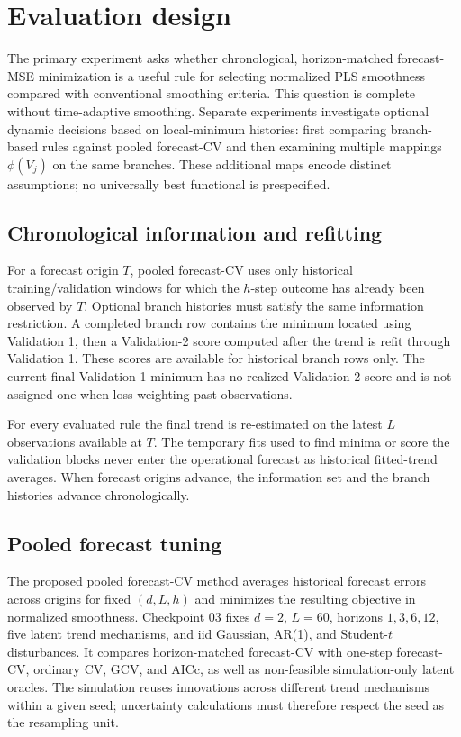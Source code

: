 \section{Evaluation design}
\label{sec:evaluation}

The primary experiment asks whether chronological, horizon-matched
forecast-MSE minimization is a useful rule for selecting normalized PLS
smoothness compared with conventional smoothing criteria. This question
is complete without time-adaptive smoothing. Separate experiments
investigate optional dynamic decisions based on local-minimum histories:
first comparing branch-based rules against pooled forecast-CV and then
examining multiple mappings $\phi(V_j)$ on the same branches. These
additional maps encode distinct assumptions; no universally best
functional is prespecified.

\subsection{Chronological information and refitting}

For a forecast origin $T$, pooled forecast-CV uses only historical
training/validation windows for which the $h$-step outcome has already
been observed by $T$. Optional branch histories must satisfy the same
information restriction.
A completed branch row contains the minimum located using Validation 1,
then a Validation-2 score computed after the trend is refit through
Validation 1. These scores are available for historical branch rows only.
The current final-Validation-1 minimum has no realized Validation-2 score
and is not assigned one when loss-weighting past observations.

For every evaluated rule the final trend is re-estimated on the latest
$L$ observations available at $T$. The temporary fits used to find minima
or score the validation blocks never enter the operational forecast as
historical fitted-trend averages. When forecast origins advance, the
information set and the branch histories advance chronologically.

\subsection{Pooled forecast tuning}

The proposed pooled forecast-CV method averages historical forecast errors across origins
for fixed $(d,L,h)$ and minimizes the resulting objective in normalized
smoothness. Checkpoint 03 fixes $d=2$, $L=60$, horizons $1,3,6,12$,
five latent trend mechanisms, and iid Gaussian, AR(1), and Student-$t$
disturbances. It compares horizon-matched forecast-CV with one-step
forecast-CV, ordinary CV, GCV, and AICc, as well as non-feasible
simulation-only latent oracles. The simulation reuses innovations across
different trend mechanisms within a given seed; uncertainty calculations
must therefore respect the seed as the resampling unit.

